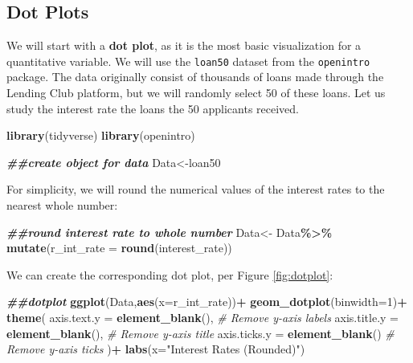 \documentclass[
]{book}
\newenvironment{Shaded}{\begin{snugshade}}{\end{snugshade}}
\newcommand{\AttributeTok}[1]{\textcolor[rgb]{0.13,0.29,0.53}{#1}}
\newcommand{\CommentTok}[1]{\textcolor[rgb]{0.56,0.35,0.01}{\textit{#1}}}
\newcommand{\DecValTok}[1]{\textcolor[rgb]{0.00,0.00,0.81}{#1}}
\newcommand{\DocumentationTok}[1]{\textcolor[rgb]{0.56,0.35,0.01}{\textbf{\textit{#1}}}}
\newcommand{\FunctionTok}[1]{\textcolor[rgb]{0.13,0.29,0.53}{\textbf{#1}}}
\newcommand{\NormalTok}[1]{#1}
\newcommand{\OtherTok}[1]{\textcolor[rgb]{0.56,0.35,0.01}{#1}}
\newcommand{\SpecialCharTok}[1]{\textcolor[rgb]{0.81,0.36,0.00}{\textbf{#1}}}
\newcommand{\StringTok}[1]{\textcolor[rgb]{0.31,0.60,0.02}{#1}}
\begin{document}
\subsection{Dot Plots}\label{dot-plots}

We will start with a \textbf{dot plot}, as it is the most basic visualization for a quantitative variable. We will use the \texttt{loan50} dataset from the \texttt{openintro} package. The data originally consist of thousands of loans made through the Lending Club platform, but we will randomly select 50 of these loans. Let us study the interest rate the loans the 50 applicants received.

\begin{Shaded}
\begin{Highlighting}[]
\FunctionTok{library}\NormalTok{(tidyverse)}
\FunctionTok{library}\NormalTok{(openintro)}

\DocumentationTok{\#\#create object for data}
\NormalTok{Data}\OtherTok{\textless{}{-}}\NormalTok{loan50}
\end{Highlighting}
\end{Shaded}

For simplicity, we will round the numerical values of the interest rates to the nearest whole number:

\begin{Shaded}
\begin{Highlighting}[]
\DocumentationTok{\#\#round interest rate to whole number}
\NormalTok{Data}\OtherTok{\textless{}{-}}\NormalTok{ Data}\SpecialCharTok{\%\textgreater{}\%}
  \FunctionTok{mutate}\NormalTok{(}\AttributeTok{r\_int\_rate =} \FunctionTok{round}\NormalTok{(interest\_rate))}
\end{Highlighting}
\end{Shaded}

We can create the corresponding dot plot, per Figure \ref{fig:dotplot}:

\begin{Shaded}
\begin{Highlighting}[]
\DocumentationTok{\#\#dotplot}
\FunctionTok{ggplot}\NormalTok{(Data,}\FunctionTok{aes}\NormalTok{(}\AttributeTok{x=}\NormalTok{r\_int\_rate))}\SpecialCharTok{+}
  \FunctionTok{geom\_dotplot}\NormalTok{(}\AttributeTok{binwidth=}\DecValTok{1}\NormalTok{)}\SpecialCharTok{+}
  \FunctionTok{theme}\NormalTok{(}
    \AttributeTok{axis.text.y =} \FunctionTok{element\_blank}\NormalTok{(),  }\CommentTok{\# Remove y{-}axis labels}
    \AttributeTok{axis.title.y =} \FunctionTok{element\_blank}\NormalTok{(), }\CommentTok{\# Remove y{-}axis title}
    \AttributeTok{axis.ticks.y =} \FunctionTok{element\_blank}\NormalTok{()  }\CommentTok{\# Remove y{-}axis ticks}
\NormalTok{  )}\SpecialCharTok{+} 
  \FunctionTok{labs}\NormalTok{(}\AttributeTok{x=}\StringTok{"Interest Rates (Rounded)"}\NormalTok{)}
\end{Highlighting}
\end{Shaded}
\end{document}
